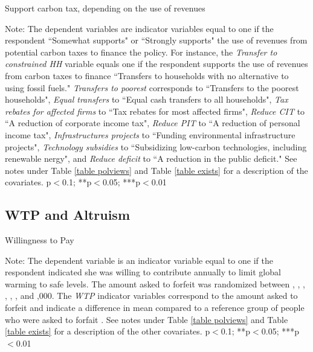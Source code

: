 \documentclass{article}
\begin{document}
\begin{landscape}
	\begin{table}[h!]
	\caption{Support carbon tax, depending on the use of revenues}
	\begin{center}
		\scalebox{0.55}{}
	\end{center}
	{\footnotesize Note: The dependent variables are indicator variables equal to one if the respondent ``Somewhat supports" or ``Strongly supports" the use of revenues from potential carbon taxes to finance the policy. For instance, the \textit{Transfer to constrained HH} variable equals one if the respondent supports the use of revenues from carbon taxes to finance ``Transfers to households with no alternative to using fossil fuels." \textit{Transfers to poorest} corresponds to ``Transfers to the poorest households", \textit{Equal transfers} to ``Equal cash transfers to all households", \textit{Tax rebates for affected firms} to ``Tax rebates for most affected firms", \textit{Reduce CIT} to ``A reduction of corporate income tax", \textit{Reduce PIT} to ``A reduction of personal income tax", \textit{Infrastructures projects} to ``Funding environmental infrastructure projects", \textit{Technology subsidies} to ``Subsidizing low-carbon technologies, including renewable nergy", and \textit{Reduce deficit} to ``A reduction in the public deficit."  See notes under Table \ref{table polviews} and Table \ref{table exists} for a description of the covariates.
	\newline *p$<$0.1; **p$<$0.05; ***p$<$0.01}
\end{table}	
\end{landscape}



\clearpage
\subsection{WTP and Altruism}



\begin{table}[h!]
	\caption{Willingness to Pay}
	\begin{center}
		\scalebox{0.7}{}
	\end{center}
	{\footnotesize Note: The dependent variable is an indicator variable equal to one if the respondent indicated she was willing to contribute annually to limit global warming to safe levels. The amount asked to forfeit was randomized between , , , , , , and ,000. The \textit{WTP} indicator variables correspond to the amount asked to forfeit and indicate a difference in mean compared to a reference group of people who were asked to forfait . See notes under Table \ref{table polviews} and Table \ref{table exists} for a description of the other covariates.
	\newline *p$<$0.1; **p$<$0.05; ***p$<$0.01}
\end{table}	
\end{document}
